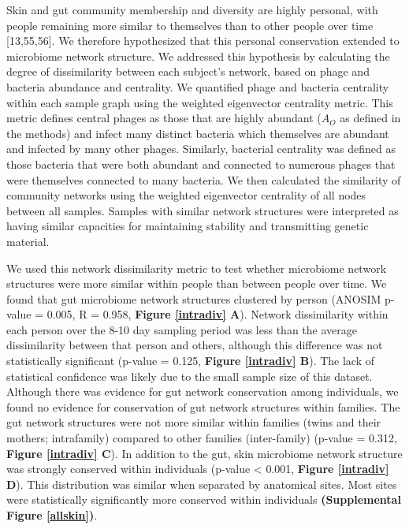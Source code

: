 \documentclass[12pt,]{article}
\begin{document}
Skin and gut community membership and diversity are highly personal,
with people remaining more similar to themselves than to other people
over time {[}13,55,56{]}. We therefore hypothesized that this personal
conservation extended to microbiome network structure. We addressed this
hypothesis by calculating the degree of dissimilarity between each
subject's network, based on phage and bacteria abundance and centrality.
We quantified phage and bacteria centrality within each sample graph
using the weighted eigenvector centrality metric. This metric defines
central phages as those that are highly abundant (\(A_{O}\) as defined
in the methods) and infect many distinct bacteria which themselves are
abundant and infected by many other phages. Similarly, bacterial
centrality was defined as those bacteria that were both abundant and
connected to numerous phages that were themselves connected to many
bacteria. We then calculated the similarity of community networks using
the weighted eigenvector centrality of all nodes between all samples.
Samples with similar network structures were interpreted as having
similar capacities for maintaining stability and transmitting genetic
material.

We used this network dissimilarity metric to test whether microbiome
network structures were more similar within people than between people
over time. We found that gut microbiome network structures clustered by
person (ANOSIM p-value = 0.005, R = 0.958, \textbf{Figure \ref{intradiv}
A}). Network dissimilarity within each person over the 8-10 day sampling
period was less than the average dissimilarity between that person and
others, although this difference was not statistically significant
(p-value = 0.125, \textbf{Figure \ref{intradiv} B}). The lack of
statistical confidence was likely due to the small sample size of this
dataset. Although there was evidence for gut network conservation among
individuals, we found no evidence for conservation of gut network
structures within families. The gut network structures were not more
similar within families (twins and their mothers; intrafamily) compared
to other families (inter-family) (p-value = 0.312, \textbf{Figure
\ref{intradiv} C}). In addition to the gut, skin microbiome network
structure was strongly conserved within individuals (p-value \textless{}
0.001, \textbf{Figure \ref{intradiv} D}). This distribution was similar
when separated by anatomical sites. Most sites were statistically
significantly more conserved within individuals \textbf{(Supplemental
Figure \ref{allskin})}.
\end{document}

